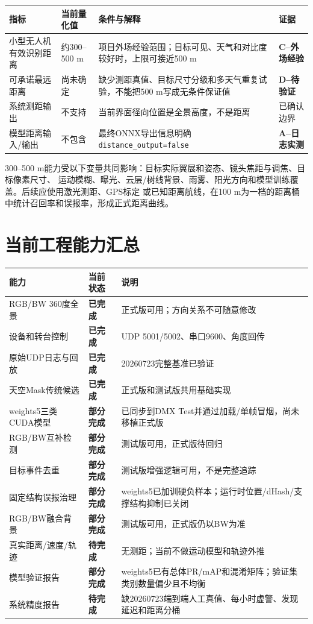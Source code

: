\documentclass[UTF8,a4paper,11pt,openany]{ctexrep}
\newcommand{\metricA}{\textcolor{dmxgreen}{\textbf{A--日志实测}}}
\newcommand{\metricC}{\textcolor{orange!80!black}{\textbf{C--外场经验}}}
\newcommand{\metricD}{\textcolor{dmxred}{\textbf{D--待验证}}}
\newcommand{\yes}{\textcolor{dmxgreen}{\textbf{已完成}}}
\newcommand{\partialdone}{\textcolor{orange!80!black}{\textbf{部分完成}}}
\newcommand{\todo}{\textcolor{dmxred}{\textbf{待完成}}}
\begin{document}
\begin{table}[H]
  \centering
  \begin{tabularx}{\textwidth}{p{4.0cm}p{3.2cm}X p{2.7cm}}
    \toprule
    指标 & 当前量化值 & 条件与解释 & 证据 \\
    \midrule
    小型无人机有效识别距离 & 约300--500 m & 项目外场经验范围；目标可见、天气和对比度较好时，上限可接近500 m & \metricC \\
    可承诺最远距离 & 尚未确定 & 缺少测距真值、目标尺寸分级和多天气重复试验，不能把500 m写成无条件保证值 & \metricD \\
    系统测距输出 & 不支持 & 当前界面径向位置是全景高度，不是距离 & 已确认边界 \\
    模型距离输入/输出 & 不包含 & 最终ONNX导出信息明确\texttt{distance\_output=false} & \metricA \\
    \bottomrule
  \end{tabularx}
\end{table}

300--500 m能力受以下变量共同影响：目标实际翼展和姿态、镜头焦距与调焦、目标像素尺寸、
运动模糊、曝光、云层/树线背景、雨雾、阳光方向和模型训练覆盖。后续应使用激光测距、GPS标定
或已知距离航线，在100 m为一档的距离桶中统计召回率和误报率，形成正式距离曲线。

\section{当前工程能力汇总}

\begin{table}[H]
  \centering
  \small
  \begin{tabularx}{\textwidth}{p{4.1cm}p{3.6cm}X}
    \toprule
    能力 & 当前状态 & 说明 \\
    \midrule
    RGB/BW 360度全景 & \yes & 正式版可用；方向关系不可随意修改 \\
    设备和转台控制 & \yes & UDP 5001/5002、串口9600、角度回传 \\
    原始UDP日志与回放 & \yes & 20260723完整基准已验证 \\
    天空Mask传统候选 & \yes & 正式版和测试版共用基础实现 \\
    weights5三类CUDA模型 & \partialdone & 已同步到DMX Test并通过加载/单帧冒烟，尚未移植正式版 \\
    RGB/BW互补检测 & \partialdone & 测试版可用，正式版待回归 \\
    目标事件去重 & \partialdone & 测试版增强逻辑可用，不是完整追踪 \\
    固定结构误报治理 & \partialdone & weights5已加训硬负样本；运行时位置/dHash/支撑结构抑制已关闭 \\
    RGB/BW融合背景 & \partialdone & 测试版可用，正式版仍以BW为准 \\
    真实距离/速度/轨迹 & \todo & 无测距；当前不做运动模型和轨迹外推 \\
    模型验证报告 & \partialdone & weights5已有总体PR/mAP和混淆矩阵；验证集类别数量偏少且不均衡 \\
    系统精度报告 & \todo & 缺20260723端到端人工真值、每小时虚警、发现延迟和距离分桶 \\
    \bottomrule
  \end{tabularx}
\end{table}
\end{document}

